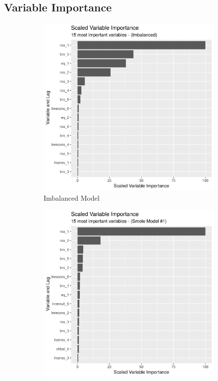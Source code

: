 \documentclass[12pt,a4paper]{article}
\begin{document}
\begin{appendices}
\section{Variable Importance}\label{app:variable_importance}
\begin{figure}[h!] %
\begin{subfigure}{0.48\textwidth}
\includegraphics[width=\linewidth]{./graphics/var_imp/var_imp_imbalanced.png}
\caption{Imbalanced Model} \label{fig:a}
\end{subfigure}\hspace*{\fill}
\begin{subfigure}{0.48\textwidth}
\includegraphics[width=\linewidth]{./graphics/var_imp/var_imp_smote1.png}

\end{subfigure}
\end{figure}
\end{appendices}
\end{document}
